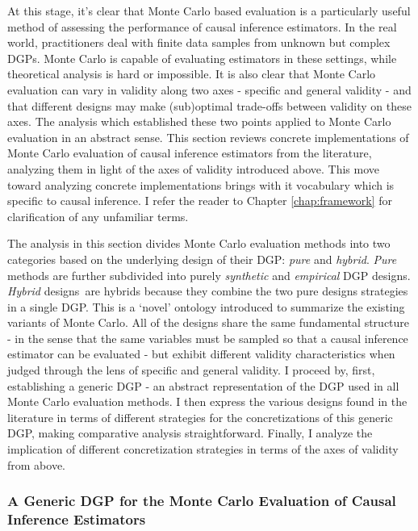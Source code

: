 \documentclass[../main.tex]{subfiles}
\begin{document}
\vspace{\baselineskip}
At this stage, it’s clear that Monte Carlo based evaluation is a particularly useful method of assessing the performance of causal inference estimators. In the real world, practitioners deal with finite data samples from unknown but complex DGPs. Monte Carlo is capable of evaluating estimators in these settings, while theoretical analysis is hard or impossible. It is also clear that Monte Carlo evaluation can vary in validity along two axes - specific and general validity - and that different designs may make (sub)optimal trade-offs between validity on these axes. The analysis which established these two points applied to Monte Carlo evaluation in an abstract sense. This section reviews concrete implementations of Monte Carlo evaluation of causal inference estimators from the literature, analyzing them in light of the axes of validity introduced above. This move toward analyzing concrete implementations brings with it vocabulary which is specific to causal inference. I refer the reader to Chapter \ref{chap:framework} for clarification of any unfamiliar terms.\par


\vspace{\baselineskip}
The analysis in this section divides Monte Carlo evaluation methods into two categories based on the underlying design of their DGP: \textit{pure} and \textit{hybrid}. \textit{Pure} methods are further subdivided into purely \textit{synthetic }and \textit{empirical }DGP designs. \textit{Hybrid }designs\ are hybrids because they combine the two pure designs strategies in a single DGP. This is a ‘novel’ ontology introduced to summarize the existing variants of Monte Carlo. All of the designs share the same fundamental structure  - in the sense that the same variables must be sampled so that a causal inference estimator can be evaluated - but exhibit different validity characteristics when judged through the lens of specific and general validity. I proceed by, first, establishing a generic DGP - an abstract representation of the DGP used in all Monte Carlo evaluation methods. I then express the various designs found in the literature in terms of different strategies for the concretizations of this generic DGP, making comparative analysis straightforward. Finally, I analyze the implication of different concretization strategies in terms of the axes of validity from above.\par

\subsubsection{A Generic DGP for the Monte Carlo Evaluation of Causal Inference Estimators}
\end{document}
